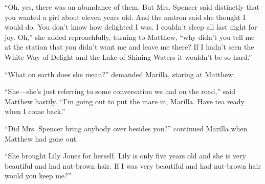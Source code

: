 \documentclass[a4paper]{article}
\begin{document}
``Oh, yes, there was an abundance of them. But Mrs. Spencer said distinctly that you wanted a girl about eleven years old. And the matron said she thought I would do. You don't know how delighted I was. I couldn't sleep all last night for joy. Oh,'' she added reproachfully, turning to Matthew, ``why didn't you tell me at the station that you didn't want me and leave me there? If I hadn't seen the White Way of Delight and the Lake of Shining Waters it wouldn't be so hard.''

{\LARGE ``What on earth does she mean?'' demanded Marilla, staring at Matthew.}

\small ``She---she's just referring to some conversation we had on the road,'' said Matthew hastily. ``I'm going out to put the mare in, Marilla. Have tea ready when I come back.''

{\Large ``Did Mrs. Spencer bring anybody over besides you?'' continued Marilla when Matthew had gone out.

``She brought Lily Jones for herself. Lily is only five years old and she is very beautiful and had nut-brown hair. If I was very beautiful and had nut-brown hair would you keep me?''}
\end{document}
